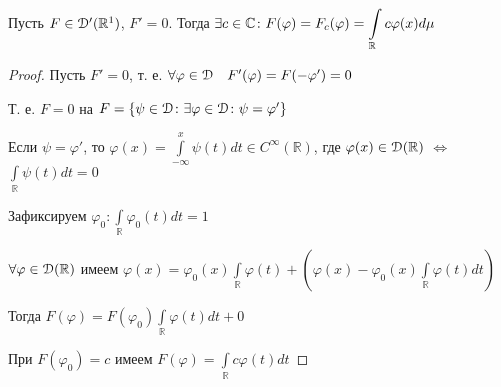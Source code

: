 \documentclass[a4paper,12pt]{report}
\newcommand*{\hm}[1]{#1\nobreak\discretionary{}%
            {\hbox{$\mathsurround=0pt #1$}}{}}
\begin{document}
\begin{lem}
Пусть $F\in\EuScript D'(\mathbb R^1)$, $F'=0$. Тогда $\exists c\in\mathbb C\colon F(\varphi)=F_c(\varphi)\hm=\displaystyle\int\limits_{\mathbb R}c\varphi(x)d\mu$
\end{lem}
\begin{proof}
Пусть $F'=0$, т. е. $\forall\varphi\in\EuScript D\quad F'(\varphi)=F(-\varphi')=0$

Т. е. $F=0$ на $F=\{\psi\in\EuScript D\colon\exists\varphi\in\EuScript D\colon\psi=\varphi'\}$

Если $\psi=\varphi'$, то $\varphi(x)=\displaystyle\int\limits_{-\infty}^x\psi(t)dt\in C^\infty(\mathbb R)$, где $\varphi(x)\in\EuScript D(\mathbb R)$ $\Leftrightarrow$ ${\displaystyle\int\limits_{\mathbb R}\psi(t)dt=0}$

Зафиксируем $\varphi_0\colon\displaystyle\int\limits_{\mathbb R}\varphi_0(t)dt=1$

$\forall\varphi\in\EuScript D(\mathbb R)$ имеем $\varphi(x)=\varphi_0(x)\displaystyle\int\limits_{\mathbb R}\varphi(t)+\left(\varphi(x)-\varphi_0(x)\displaystyle\int\limits_{\mathbb R}\varphi(t)dt\right)$

Тогда $F(\varphi)=F(\varphi_0)\displaystyle\int\limits_{\mathbb R}\varphi(t)dt+0$

При $F(\varphi_0)=c$ имеем $F(\varphi)=\displaystyle\int\limits_{\mathbb R}c\varphi(t)dt$
\end{proof}
\end{document}

